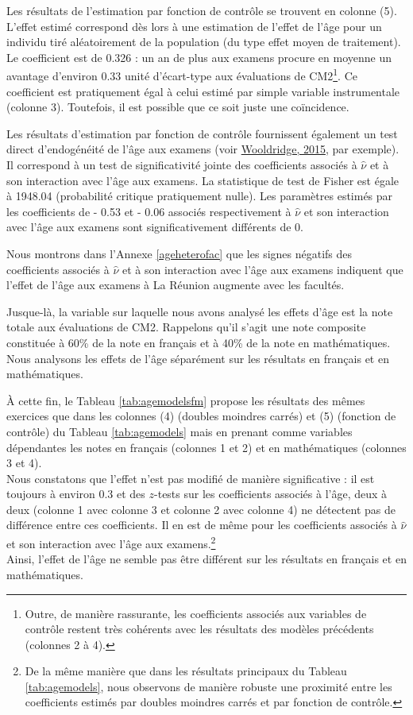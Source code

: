 \documentclass[
]{book}
\begin{document}
\quad Les résultats de l'estimation par fonction de contrôle se trouvent en colonne (5). L'effet estimé correspond dès lors à une estimation de l'effet de l'âge pour un individu tiré aléatoirement de la population (du type effet moyen de traitement). Le coefficient est de 0.326 : un an de plus aux examens procure en moyenne un avantage d'environ 0.33 unité d'écart-type aux évaluations de CM2\footnote{Outre, de manière rassurante, les coefficients associés aux variables de contrôle restent très cohérents avec les résultats des modèles précédents (colonnes 2 à 4).}. Ce coefficient est pratiquement égal à celui estimé par simple variable instrumentale (colonne 3). Toutefois, il est possible que ce soit juste une coïncidence.

\quad Les résultats d'estimation par fonction de contrôle fournissent également un test direct d'endogénéité de l'âge aux examens (voir \protect\hyperlink{ref-WOO:15}{Wooldridge, 2015}, par exemple). Il correspond à un test de significativité jointe des coefficients associés à \(\hat{\nu}\) et à son interaction avec l'âge aux examens. La statistique de test de Fisher est égale à 1948.04 (probabilité critique pratiquement nulle). Les paramètres estimés par les coefficients de - 0.53 et - 0.06 associés respectivement à \(\hat{\nu}\) et son interaction avec l'âge aux examens sont significativement différents de 0.

\quad Nous montrons dans l'Annexe \ref{ageheterofac} que les signes négatifs des coefficients associés à \(\hat{\nu}\) et à son interaction avec l'âge aux examens indiquent que l'effet de l'âge aux examens à La Réunion augmente avec les facultés.

\quad Jusque-là, la variable sur laquelle nous avons analysé les effets d'âge est la note totale aux évaluations de CM2. Rappelons qu'il s'agit une note composite constituée à 60\% de la note en français et à 40\% de la note en mathématiques. Nous analysons les effets de l'âge séparément sur les résultats en français et en mathématiques.

\quad À cette fin, le Tableau \ref{tab:agemodelsfm} propose les résultats des mêmes exercices que dans les colonnes (4) (doubles moindres carrés) et (5) (fonction de contrôle) du Tableau \ref{tab:agemodels} mais en prenant comme variables dépendantes les notes en français (colonnes 1 et 2) et en mathématiques (colonnes 3 et 4).\\
Nous constatons que l'effet n'est pas modifié de manière significative : il est toujours à environ 0.3 et des \(z\)-tests sur les coefficients associés à l'âge, deux à deux (colonne 1 avec colonne 3 et colonne 2 avec colonne 4) ne détectent pas de différence entre ces coefficients. Il en est de même pour les coefficients associés à \(\hat{\nu}\) et son interaction avec l'âge aux examens.\footnote{De la même manière que dans les résultats principaux du Tableau \ref{tab:agemodels}, nous observons de manière robuste une proximité entre les coefficients estimés par doubles moindres carrés et par fonction de contrôle.}\\
Ainsi, l'effet de l'âge ne semble pas être différent sur les résultats en français et en mathématiques.
\end{document}
